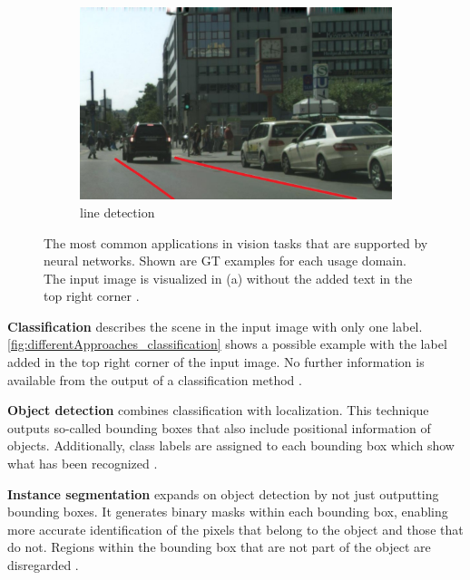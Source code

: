 \begin{figure}[H]
    \hfill
    \begin{subfigure}{0.328\textwidth}
        \includegraphics[width=\linewidth]{PICs/differentApproaches/line_detection.jpg}
        \caption{line detection}
        \label{fig:differentApproaches_line_detection}
    \end{subfigure}

    \caption{The most common applications in vision tasks that are supported by neural networks. Shown are \ac{GT} examples for each usage domain. The input image is visualized in (a) without the added text in the top right corner \cite{panopticsegmentation2019}.}
    \label{fig:differentApproaches}
\end{figure}

\clearpage
\noindent\textbf{Classification} describes the scene in the input image with only one label.
\autoref{fig:differentApproaches_classification} shows a possible example with the label added in the top right corner of the input image.
No further information is available from the output of a classification method \cite{cifar100}.

\vspace{1cm} %

\noindent\textbf{Object detection} combines classification with localization.
This technique outputs so-called bounding boxes that also include positional information of objects.
Additionally, class labels are assigned to each bounding box which show what has been recognized \cite{panopticsegmentation2019}.

\vspace{1cm} %

\noindent\textbf{Instance segmentation} expands on object detection by not just outputting bounding boxes.
It generates binary masks within each bounding box, enabling more accurate identification of the pixels that belong to the object and those that do not.
Regions within the bounding box that are not part of the object are disregarded \cite{panopticsegmentation2019}.

